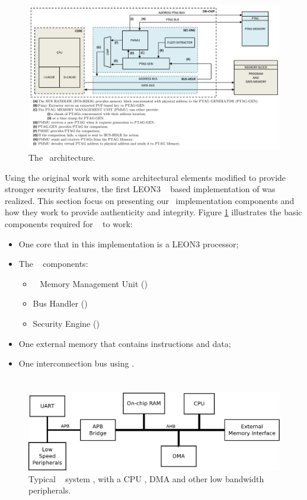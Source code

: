 \begin{figure}[!ht]
	\centering
	\includegraphics[width=\textwidth]{figures/pdf/cshia.pdf}
	\caption{The \cshia~architecture.}
	\label{fig:cshia}
\end{figure}
Using the original work with some architectural elements modified to provide stronger security features, the first LEON3 \fpga~ based implementation of \cshia was realized. This section focus on presenting our \cshia~implementation components and how they work to provide authenticity and integrity. Figure \ref{fig:cshia} illustrates the basic components required for \cshia~ to work: 
\begin{itemize}
    \item One core that in this implementation is a LEON3 processor;
    \item The \cshia~ components:
    \begin{itemize}
        \item \ptag~ Memory Management Unit (\pmmu)
        \item Bus Handler (\handler)
        \item Security Engine (\seceng) 
    \end{itemize}
    \item One external memory that contains instructions and data;
    \item One interconnection bus using \amba.
\end{itemize} 


\section{\amba}
\label{sec:amba2}
\begin{figure}[!ht]
    \centering
    \includegraphics[width=1\textwidth]{figures/pdf/typical_amba_new.pdf}
    \caption{Typical \amba~ system , with a CPU , DMA and other low bandwidth peripherals. }
    \label{fig:general}
\end{figure}

